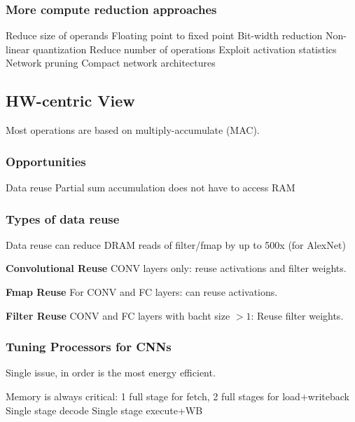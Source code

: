 \documentclass[a4paper, fontsize=8pt, landscape, DIV=1]{scrartcl}
\begin{document}
\begin{multicols*}{4}
  \subsubsection{More compute reduction approaches}
  \begin{outline}
    \1 Reduce size of operands
      \2 Floating point to fixed point
      \2 Bit-width reduction
      \2 Non-linear quantization
    \1 Reduce number of operations
      \2 Exploit activation statistics
      \2 Network pruning
      \2 Compact network architectures
  \end{outline}


  \subsection{HW-centric View}
  Most operations are based on multiply-accumulate (MAC).

  \subsubsection{Opportunities}
  \begin{outline}
    \1 Data reuse
    \1 Partial sum accumulation does not have to access RAM
  \end{outline}

  \subsubsection{Types of data reuse}
  Data reuse can reduce DRAM reads  of filter/fmap by up to 500x (for AlexNet)

  \textbf{Convolutional Reuse} CONV layers only: reuse activations and filter weights.

  \textbf{Fmap Reuse} For CONV and FC layers: can reuse activations.

  \textbf{Filter Reuse} CONV and FC layers with bacht size $> 1$: Reuse filter weights.

  \subsubsection{Tuning Processors for CNNs}
  Single issue, in order is the most energy efficient.
  \begin{outline}
    \1 Memory is always critical: 1 full stage for fetch, 2 full stages for load+writeback
    \1 Single stage decode
    \1 Single stage execute+WB
  \end{outline}


\end{multicols*}
\end{document}
